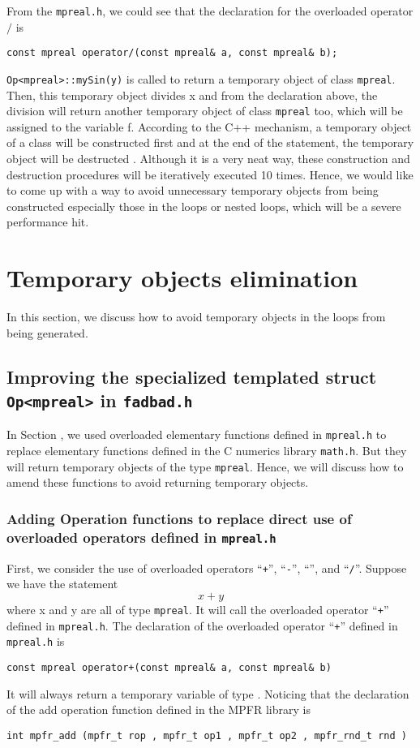 From the \texttt{mpreal.h}, we could see that the declaration for the overloaded operator $/$ is
\begin{lstlisting}[numbers=none]
const mpreal operator/(const mpreal& a, const mpreal& b);
\end{lstlisting}
\texttt{Op<mpreal>::mySin(y)} is called to return a temporary object of class \texttt{mpreal}. Then, this temporary object divides x and from the declaration above, the division will return another temporary object of class \texttt{mpreal} too, which will be assigned to the variable f. According to the C++ mechanism, a temporary object of a class will be constructed first and at the end of the statement, the temporary object will be destructed \cite{C++Primer}. Although it is a very neat way, these construction and destruction procedures will be iteratively executed 10 times. Hence, we would like to come up with a way to avoid unnecessary temporary objects from being constructed especially those in the loops or nested loops, which will be a severe performance hit.
 

\section{Temporary objects elimination}
In this section, we discuss how to avoid temporary objects in the loops from being generated.
\subsection{Improving the specialized templated struct {\tt Op<mpreal>} in \textbf\texttt{fadbad.h}}
In Section , we used overloaded elementary functions defined in {\tt mpreal.h} to replace elementary functions defined in the C numerics library {\tt math.h}. But they will return temporary objects of the type {\tt mpreal}. Hence, we will discuss how to amend these functions to avoid returning temporary objects.
\subsubsection{Adding Operation functions to replace direct use of overloaded operators defined in \textbf\texttt{mpreal.h}}
First, we consider the use of overloaded operators ``{\tt +}'', ``{\tt -}'', ``{\tt *}'', and ``{\tt /}''. Suppose we have the statement
$$x + y$$
where x and y are all of type {\tt mpreal}. It will call the overloaded operator ``{\tt +}'' defined in {\tt mpreal.h}. The declaration of the overloaded operator ``{\tt +}'' defined in {\tt mpreal.h} is
\begin{lstlisting}[numbers=none]
const mpreal operator+(const mpreal& a, const mpreal& b)
\end{lstlisting}
It will always return a temporary variable of type \mpreal. Noticing that the declaration of the add operation function defined in the MPFR library is
\begin{lstlisting}[numbers=none]
int mpfr_add (mpfr_t rop , mpfr_t op1 , mpfr_t op2 , mpfr_rnd_t rnd )
\end{lstlisting}


